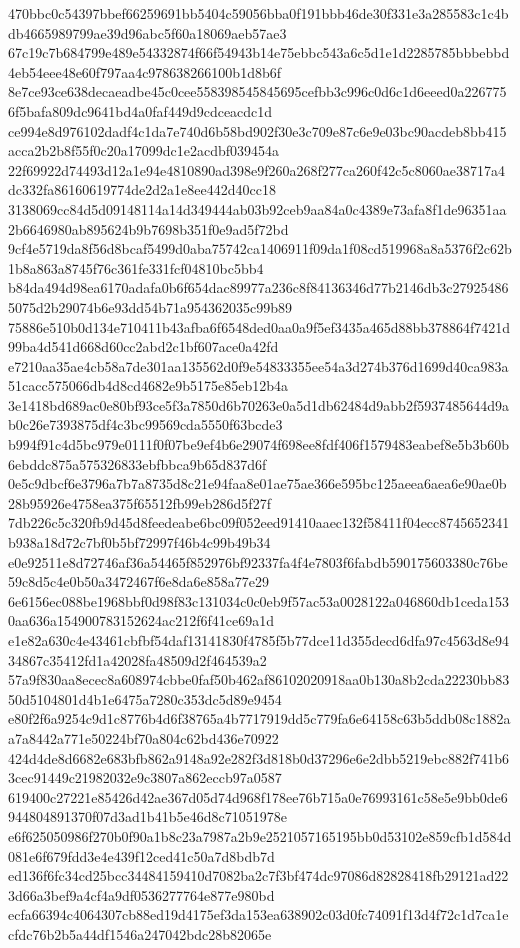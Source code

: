 \documentclass[11pt,a4paper]{article}
\begin{document}
{470bbc0c54397bbef66259691bb5404c59056bba0f191bbb46de30f331e3a285583c1c4bdb4665989799ae39d96abc5f60a18069aeb57ae3
67c19c7b684799e489e54332874f66f54943b14e75ebbc543a6c5d1e1d2285785bbbebbd4eb54eee48e60f797aa4c978638266100b1d8b6f
8e7ce93ce638decaeadbe45c0cee558398545845695cefbb3c996c0d6c1d6eeed0a2267756f5bafa809dc9641bd4a0faf449d9cdceacdc1d
ce994e8d976102dadf4c1da7e740d6b58bd902f30e3c709e87c6e9e03bc90acdeb8bb415acca2b2b8f55f0c20a17099dc1e2acdbf039454a
22f69922d74493d12a1e94e4810890ad398e9f260a268f277ca260f42c5c8060ae38717a4dc332fa86160619774de2d2a1e8ee442d40cc18
3138069cc84d5d09148114a14d349444ab03b92ceb9aa84a0c4389e73afa8f1de96351aa2b6646980ab895624b9b7698b351f0e9ad5f72bd
9cf4e5719da8f56d8bcaf5499d0aba75742ca1406911f09da1f08cd519968a8a5376f2c62b1b8a863a8745f76c361fe331fcf04810bc5bb4
b84da494d98ea6170adafa0b6f654dac89977a236c8f84136346d77b2146db3c279254865075d2b29074b6e93dd54b71a954362035c99b89
75886e510b0d134e710411b43afba6f6548ded0aa0a9f5ef3435a465d88bb378864f7421d99ba4d541d668d60cc2abd2c1bf607ace0a42fd
e7210aa35ae4cb58a7de301aa135562d0f9e54833355ee54a3d274b376d1699d40ca983a51cacc575066db4d8cd4682e9b5175e85eb12b4a
3e1418bd689ac0e80bf93ce5f3a7850d6b70263e0a5d1db62484d9abb2f5937485644d9ab0c26e7393875df4c3bc99569cda5550f63bcde3
b994f91c4d5bc979e0111f0f07be9ef4b6e29074f698ee8fdf406f1579483eabef8e5b3b60b6ebddc875a575326833ebfbbca9b65d837d6f
0e5c9dbcf6e3796a7b7a8735d8c21e94faa8e01ae75ae366e595bc125aeea6aea6e90ae0b28b95926e4758ea375f65512fb99eb286d5f27f
7db226c5c320fb9d45d8feedeabe6bc09f052eed91410aaec132f58411f04ecc8745652341b938a18d72c7bf0b5bf72997f46b4c99b49b34
e0e92511e8d72746af36a54465f852976bf92337fa4f4e7803f6fabdb590175603380c76be59c8d5c4e0b50a3472467f6e8da6e858a77e29
6e6156ec088be1968bbf0d98f83c131034c0c0eb9f57ac53a0028122a046860db1ceda1530aa636a154900783152624ac212f6f41ce69a1d
e1e82a630c4e43461cbfbf54daf13141830f4785f5b77dce11d355decd6dfa97c4563d8e9434867c35412fd1a42028fa48509d2f464539a2
57a9f830aa8ecec8a608974cbbe0faf50b462af86102020918aa0b130a8b2cda22230bb8350d5104801d4b1e6475a7280c353dc5d89e9454
e80f2f6a9254c9d1c8776b4d6f38765a4b7717919dd5c779fa6e64158c63b5ddb08c1882aa7a8442a771e50224bf70a804c62bd436e70922
424d4de8d6682e683bfb862a9148a92e282f3d818b0d37296e6e2dbb5219ebc882f741b63cec91449c21982032e9c3807a862eccb97a0587
619400c27221e85426d42ae367d05d74d968f178ee76b715a0e76993161c58e5e9bb0de6944804891370f07d3ad1b41b5e46d8c71051978e
e6f625050986f270b0f90a1b8c23a7987a2b9e2521057165195bb0d53102e859cfb1d584d081e6f679fdd3e4e439f12ced41c50a7d8bdb7d
ed136f6fc34cd25bcc34484159410d7082ba2c7f3bf474dc97086d82828418fb29121ad223d66a3bef9a4cf4a9df0536277764e877e980bd
ecfa66394c4064307cb88ed19d4175ef3da153ea638902c03d0fc74091f13d4f72c1d7ca1ecfdc76b2b5a44df1546a247042bdc28b82065e
}
\end{document}
